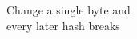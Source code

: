 \documentclass[preview]{standalone}
\begin{document}
\begin{center}
Change a single byte and\\every later hash breaks
\end{center}
\end{document}
